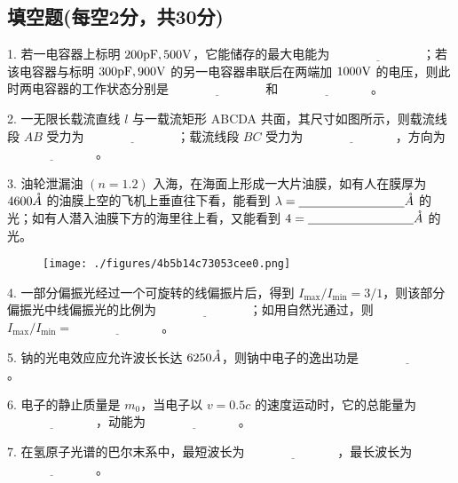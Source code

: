 \subsection{填空题(每空2分，共30分)}
1. 若一电容器上标明 $200 \\ \text{pF}, \\ 500 \\ \text{V}$，它能储存的最大电能为 $\underline{\hspace{3cm}}$；若该电容器与标明 $300 \\ \text{pF}, \\ 900 \\ \text{V}$ 的另一电容器串联后在两端加 $1000 \\ \text{V}$ 的电压，则此时两电容器的工作状态分别是 $\underline{\hspace{3cm}}$ 和 $\underline{\hspace{3cm}}$。

2. 一无限长载流直线 $l$ 与一载流矩形 ABCDA 共面，其尺寸如图所示，则载流线段 $AB$ 受力为 $\underline{\hspace{3cm}}$；载流线段 $BC$ 受力为 $\underline{\hspace{3cm}}$，方向为 $\underline{\hspace{3cm}}$。

3. 油轮泄漏油 $(n = 1.2)$ 入海，在海面上形成一大片油膜，如有人在膜厚为 $4600 \\ \mathring{A}$ 的油膜上空的飞机上垂直往下看，能看到 $\lambda= \underline{\hspace{3cm}}\\ \mathring{A}$ 的光；如有人潜入油膜下方的海里往上看，又能看到 $4 = \underline{\hspace{3cm}}\\ \mathring{A}$ 的光。
\begin{figure}[ht]
\centering
\texttt{[image: ./figures/4b5b14c73053cee0.png]}
\caption{} \label{fig_NJU08_2}
\end{figure}

4. 一部分偏振光经过一个可旋转的线偏振片后，得到 $I_{\max} / I_{\min} = 3 / 1$，则该部分偏振光中线偏振光的比例为 $\underline{\hspace{3cm}}$；如用自然光通过，则 $I_{\max} / I_{\min} = \underline{\hspace{3cm}}$。

5. 钠的光电效应应允许波长长达 $6250 \\ \mathring{A}$，则钠中电子的逸出功是 $\underline{\hspace{3cm}}$。

6. 电子的静止质量是 $m_0$，当电子以 $v = 0.5c$ 的速度运动时，它的总能量为 $\underline{\hspace{3cm}}$，动能为 $\underline{\hspace{3cm}}$。

7. 在氢原子光谱的巴尔末系中，最短波长为 $\underline{\hspace{3cm}}$，最长波长为 $\underline{\hspace{3cm}}$。